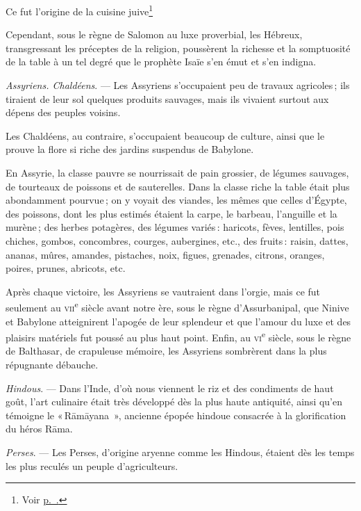 Ce fut l'origine de la cuisine juive\footnote{Voir \hyperlink{p0045}{p. {\ppp\pageref{pg0045}\mmm}.}}

Cependant, sous le règne de Salomon au luxe proverbial, les Hébreux,
transgressant les préceptes de la religion, poussèrent la richesse et la
somptuosité de la table à un tel degré que le prophète Isaïe s'en émut et s'en
indigna.

\sk

\textit{Assyriens. Chaldéens}. — Les Assyriens s'occupaient peu de travaux
agricoles ; ils tiraient de leur sol quelques produits sauvages, mais ils
vivaient surtout aux dépens des peuples voisins.

Les Chaldéens, au contraire, s'occupaient beaucoup de culture, ainsi que le
prouve la flore si riche des jardins suspendus de Babylone.

En Assyrie, la classe pauvre se nourrissait de pain grossier, de légumes
sauvages, de tourteaux de poissons et de sauterelles. Dans la classe riche la
table était plus abondamment pourvue ; on y voyait des viandes, les mêmes que
celles d'Égypte, des poissons, dont les plus estimés étaient la carpe, le
barbeau, l'anguille et la murène ; des herbes potagères, des légumes variés :
haricots, fèves, lentilles, pois chiches, gombos, concombres, courges,
aubergines, etc., des fruits : raisin, dattes, ananas, mûres, amandes,
pistaches, noix, figues, grenades, citrons, oranges, poires, prunes, abricots,
etc.

Après chaque victoire, les Assyriens se vautraient dans l'orgie, mais ce fut
seulement au \textsc{vii}\textsuperscript{e} siècle avant notre ère, sous le
règne d'Assurbanipal, que Ninive et Babylone atteignirent l'apogée de leur
splendeur et que l'amour du luxe et des plaisirs matériels fut poussé au plus
haut point. Enfin, au \textsc{vi}\textsuperscript{e} siècle, sous le règne de
Balthasar, de crapuleuse mémoire, les Assyriens sombrèrent dans la plus
répugnante débauche.

\sk

\textit{Hindous}. — Dans l'Inde, d'où nous viennent le riz et des condiments de
haut goût, l'art culinaire était très développé dès la plus haute antiquité,
ainsi qu'en témoigne le « Rāmāyana  », ancienne épopée hindoue consacrée à la
glorification du héros Rāma.

\sk

\textit{Perses}. — Les Perses, d'origine aryenne comme les Hindous, étaient dès
les temps les plus reculés un peuple d'agriculteurs.

